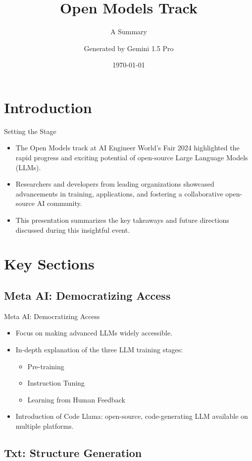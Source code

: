 \documentclass{beamer}
\title[AI Engineer World's Fair 2024]{Open Models Track}
\subtitle{A Summary}
\author{Generated by Gemini 1.5 Pro}
\date{\today}
\begin{document}
\frame{\titlepage}

\section{Introduction}

\begin{frame}{Setting the Stage}
  \begin{itemize}
    \item The Open Models track at AI Engineer World's Fair 2024 highlighted the rapid progress and exciting potential of open-source Large Language Models (LLMs).
    \item Researchers and developers from leading organizations showcased advancements in training, applications, and fostering a collaborative open-source AI community.
    \item This presentation summarizes the key takeaways and future directions discussed during this insightful event. 
  \end{itemize}
\end{frame}

\section{Key Sections}

\subsection{Meta AI: Democratizing Access}

\begin{frame}{Meta AI: Democratizing Access}
  \begin{itemize}
    \item Focus on making advanced LLMs widely accessible.
    \item In-depth explanation of the three LLM training stages:
      \begin{itemize}
        \item Pre-training
        \item Instruction Tuning
        \item Learning from Human Feedback
      \end{itemize}
    \item Introduction of Code Llama: open-source, code-generating LLM available on multiple platforms.
  \end{itemize}
\end{frame}

\subsection{Txt: Structure Generation}
\end{document}
